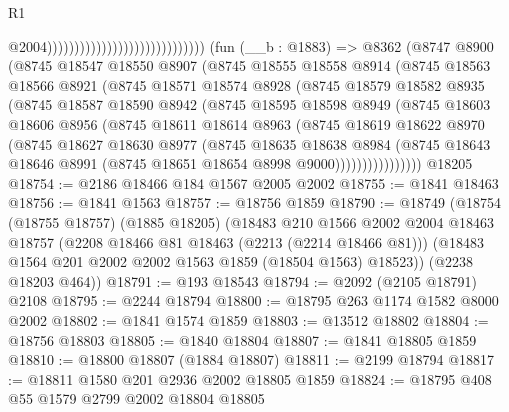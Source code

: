 \begin{lexlean}{R1}
\begin{coremodule}
                                                              @2004)))))))))))))))))))))))))))))
    (fun (__b : @1883) =>
    @8362
      (@8747
        @8900
        (@8745
          @18547
          @18550
          @8907
          (@8745
            @18555
            @18558
            @8914
            (@8745
              @18563
              @18566
              @8921
              (@8745
                @18571
                @18574
                @8928
                (@8745
                  @18579
                  @18582
                  @8935
                  (@8745
                    @18587
                    @18590
                    @8942
                    (@8745
                      @18595
                      @18598
                      @8949
                      (@8745
                        @18603
                        @18606
                        @8956
                        (@8745
                          @18611
                          @18614
                          @8963
                          (@8745
                            @18619
                            @18622
                            @8970
                            (@8745
                              @18627
                              @18630
                              @8977
                              (@8745
                                @18635
                                @18638
                                @8984
                                (@8745
                                  @18643
                                  @18646
                                  @8991
                                  (@8745 @18651 @18654 @8998 @9000))))))))))))))))
    @18205
@18754 := @2186 @18466 @184 @1567 @2005 @2002
@18755 := @1841 @18463
@18756 := @1841 @1563
@18757 := @18756 @1859
@18790 := @18749
    (@18754
      (@18755 @18757)
      (@1885 @18205)
      (@18483
        @210
        @1566
        @2002
        @2004
        @18463
        @18757
        (@2208 @18466 @81 @18463 (@2213 (@2214 @18466 @81)))
        (@18483 @1564 @201 @2002 @2002 @1563 @1859 (@18504 @1563) @18523))
      (@2238 @18203 @464))
@18791 := @193 @18543
@18794 := @2092 (@2105 @18791) @2108
@18795 := @2244 @18794
@18800 := @18795 @263 @1174 @1582 @8000 @2002
@18802 := @1841 @1574 @1859
@18803 := @13512 @18802
@18804 := @18756 @18803
@18805 := @1840 @18804
@18807 := @1841 @18805 @1859
@18810 := @18800 @18807 (@1884 @18807)
@18811 := @2199 @18794
@18817 := @18811 @1580 @201 @2936 @2002 @18805 @1859
@18824 := @18795 @408 @55 @1579 @2799 @2002 @18804 @18805

\end{coremodule}
\end{lexlean}
